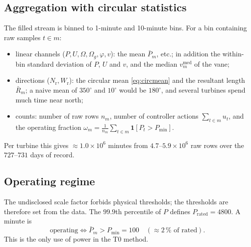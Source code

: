 \documentclass[11pt,a4paper]{article}
\theoremstyle{remark}
\newcommand{\med}{\operatorname{med}}
\newcommand{\dg}{^{\circ}}
\newcommand{\Wr}{W_{\mathrm{r}}}
\newcommand{\Nr}{N_{\mathrm{r}}}
\begin{document}
\subsection{Aggregation with circular statistics}\label{sec:agg}
The filled stream is binned to 1-minute and 10-minute bins. For a bin containing
raw samples $t\in m$:
\begin{itemize}
\item linear channels ($P,U,\Omega,\Omega_g,\varphi,v$): the mean $\bar P_m$, etc.;
      in addition the within-bin standard deviation of $P$, $U$ and $v$, and the
      median $v^{\med}_m$ of the vane;
\item directions ($\Nr,\Wr$): the circular mean \eqref{eq:circmean} and the
      resultant length $\bar R_m$; a naive mean of $350\dg$ and $10\dg$ would be
      $180\dg$, and several turbines spend much time near north;
\item counts: number of raw rows $n_m$, number of controller actions
      $\sum_{t\in m} u_t$, and the operating fraction
      $\omega_m = \frac1{n_m}\sum_{t\in m}\mathbf 1[P_t > P_{\min}]$.
\end{itemize}
Per turbine this gives $\approx1.0\times10^6$ minutes from $4.7$--$5.9\times10^6$
raw rows over the $727$--$731$ days of record.

\subsection{Operating regime}\label{sec:regimes}
The undisclosed scale factor forbids physical thresholds; the thresholds are
therefore set from the data. The $99.9$th percentile of $P$ defines
$P_{\mathrm{rated}} = 4800$. A minute is
\begin{equation}
  \text{operating} \iff \bar P_m > P_{\min} = 100 \quad(\approx2\,\% \text{ of rated}).
  \label{eq:regime}
\end{equation}
This is the only use of power in the T0 method.
\end{document}
